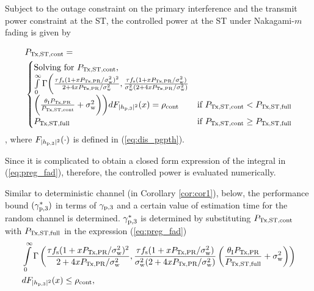 \begin{lemma} \label{lm:lm6}
\normalfont
Subject to the outage constraint on the primary interference and the transmit power constraint at the ST, the controlled power at the ST under Nakagami-$m$ fading is given by %

\begin{align}
&P_{\text{Tx,ST,cont}} = \nonumber \\ 
& \begin{cases} 
\text{Solving for $P_{\text{Tx,ST,cont}}$, } \\ \int\limits_{0}^{\infty} \Gamma\bigg(\frac{\tau f_{\text{s}} (1 + x P_{\text{Tx,PR}}/\sigma^2_{\text{w}})^2}{2 + 4 x P_{\text{Tx,PR}}/\sigma^2_{\text{w}}}, \frac{\tau f_{\text{s}} (1 + x P_{\text{Tx,PR}}/\sigma^2_{\text{w}})}{\sigma^2_{\text{w}} (2 + 4 x P_{\text{Tx,PR}}/\sigma^2_{\text{w}})} \\ \bigg(\frac{\theta_{\text{I}}P_{\text{Tx,PR}}}{P_{\text{Tx,ST,cont}}}  +  \sigma^2_{\text{w}} \bigg)\bigg) d F_{|h_{\text{p,3}}|^2}(x) = \rho_{\text{cont}} & \mbox{if } P_{\text{Tx,ST,cont}} < P_{\text{Tx,ST,full}} \\
P_{\text{Tx,ST,full}} & \mbox{if } P_{\text{Tx,ST,cont}} \ge P_{\text{Tx,ST,full}}
\end{cases}
\label{eq:preg_fad} 
\end{align}
, where %
$F_{|h_{\text{p,3}}|^2}(\cdot)$ is defined in (\ref{eq:dis_pgpth}). 
\end{lemma} 
\begin{IEEEproof}
Since it is complicated to obtain a closed form expression of the integral in (\ref{eq:preg_fad}), therefore, the controlled power is evaluated numerically.  
\end{IEEEproof}
Similar to deterministic channel (in Corollary \ref{cor:cor1}), below, the performance bound $({\gamma}_{\text{p,3}}^*)$ in terms of ${\gamma}_{\text{p,3}}$ and a certain value of estimation time for the random channel is determined.
 ${\gamma}_{\text{p,3}}^*$ is determined by substituting $P_{\text{Tx,ST,cont}}$ with $P_{\text{Tx,ST,full}}$ in the expression (\ref{eq:preg_fad}) 
\begin{align}
&\int\limits_{0}^{\infty} \Gamma\left( \frac{\tau f_{\text{s}} (1 + x P_{\text{Tx,PR}}/\sigma^2_{\text{w}})^2}{2 + 4 x P_{\text{Tx,PR}}/\sigma^2_{\text{w}}}, \frac{\tau f_{\text{s}} (1 + x P_{\text{Tx,PR}}/\sigma^2_{\text{w}})}{\sigma^2_{\text{w}} (2 + 4 x P_{\text{Tx,PR}}/\sigma^2_{\text{w}})}  \left(\frac{\theta_{\text{I}}P_{\text{Tx,PR}}}{P_{\text{Tx,ST,full}}} + \sigma^2_{\text{w}} \right)\right) \nonumber \\ & d F_{|h_{\text{p,3}}|^2}(x) \le \rho_{\text{cont}}, \label{eq:or_fad}
\end{align}
